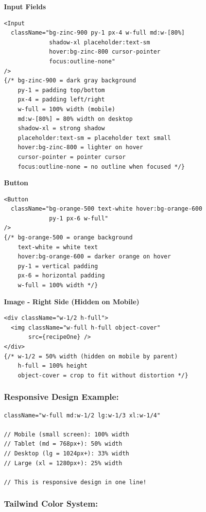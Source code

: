 \documentclass[12pt]{article}
\begin{document}
\textbf{Input Fields}

\begin{lstlisting}
<Input
  className="bg-zinc-900 py-1 px-4 w-full md:w-[80%] 
             shadow-xl placeholder:text-sm 
             hover:bg-zinc-800 cursor-pointer 
             focus:outline-none"
/>
{/* bg-zinc-900 = dark gray background
    py-1 = padding top/bottom
    px-4 = padding left/right
    w-full = 100% width (mobile)
    md:w-[80%] = 80% width on desktop
    shadow-xl = strong shadow
    placeholder:text-sm = placeholder text small
    hover:bg-zinc-800 = lighter on hover
    cursor-pointer = pointer cursor
    focus:outline-none = no outline when focused */}
\end{lstlisting}

\textbf{Button}

\begin{lstlisting}
<Button
  className="bg-orange-500 text-white hover:bg-orange-600 
             py-1 px-6 w-full"
/>
{/* bg-orange-500 = orange background
    text-white = white text
    hover:bg-orange-600 = darker orange on hover
    py-1 = vertical padding
    px-6 = horizontal padding
    w-full = 100% width */}
\end{lstlisting}

\textbf{Image - Right Side (Hidden on Mobile)}

\begin{lstlisting}
<div className="w-1/2 h-full">
  <img className="w-full h-full object-cover" 
       src={recipeOne} />
</div>
{/* w-1/2 = 50% width (hidden on mobile by parent)
    h-full = 100% height
    object-cover = crop to fit without distortion */}
\end{lstlisting}

\subsubsection*{Responsive Design Example:}

\begin{lstlisting}
className="w-full md:w-1/2 lg:w-1/3 xl:w-1/4"

// Mobile (small screen): 100% width
// Tablet (md = 768px+): 50% width
// Desktop (lg = 1024px+): 33% width
// Large (xl = 1280px+): 25% width

// This is responsive design in one line!
\end{lstlisting}

\subsubsection*{Tailwind Color System:}
\end{document}
